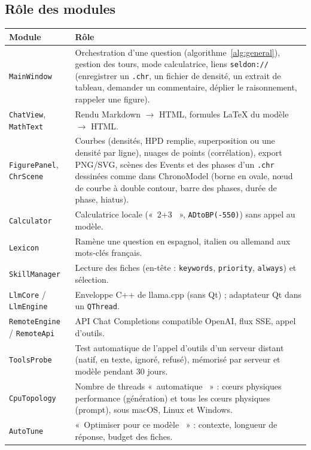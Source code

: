 \documentclass[11pt,a4paper]{article}
\providecommand{\og}{«~}\providecommand{\fg}{\unskip~»}
\newcommand{\code}[1]{\texttt{\small #1}}
\begin{document}
\subsection*{Rôle des modules}
\begin{center}\small
\begin{tabularx}{\textwidth}{@{}l X@{}}
\toprule
\textbf{Module} & \textbf{Rôle} \\ \midrule
\code{MainWindow} & Orchestration d'une question (algorithme~\ref{alg:general}), gestion des tours, mode
  calculatrice, liens \code{seldon://} (enregistrer un \code{.chr}, un fichier de densité, un extrait de tableau,
  demander un commentaire, déplier le raisonnement, rappeler une figure). \\
\code{ChatView}, \code{MathText} & Rendu Markdown $\rightarrow$ HTML, formules LaTeX du modèle $\rightarrow$ HTML. \\
\code{FigurePanel}, \code{ChrScene} & Courbes (densités, HPD remplie, superposition ou une densité par ligne), nuages de points (corrélation), export
  PNG/SVG, scènes des Events et des phases d'un \code{.chr} dessinées comme dans ChronoModel (borne en ovale, nœud de
  courbe à double contour, barre des phases, durée de phase, hiatus). \\
\code{Calculator} & Calculatrice locale (\og 2+3 \fg, \code{ADtoBP(-550)}) sans appel au modèle. \\
\code{Lexicon} & Ramène une question en espagnol, italien ou allemand aux mots-clés français. \\
\code{SkillManager} & Lecture des fiches (en-tête : \code{keywords}, \code{priority}, \code{always}) et sélection. \\
\code{LlmCore} / \code{LlmEngine} & Enveloppe C++ de llama.cpp (sans Qt) ; adaptateur Qt dans un \code{QThread}. \\
\code{RemoteEngine} / \code{RemoteApi} & API Chat Completions compatible OpenAI, flux SSE, appel d'outils. \\
\code{ToolsProbe} & Test automatique de l'appel d'outils d'un serveur distant (natif, en texte, ignoré, refusé),
  mémorisé par serveur et modèle pendant 30 jours. \\
\code{CpuTopology} & Nombre de threads \og automatique \fg{} : cœurs physiques performance (génération) et tous les
  cœurs physiques (prompt), sous macOS, Linux et Windows. \\
\code{AutoTune} & \og Optimiser pour ce modèle \fg{} : contexte, longueur de réponse, budget des fiches. \\

\end{tabularx}
\end{center}
\end{document}
